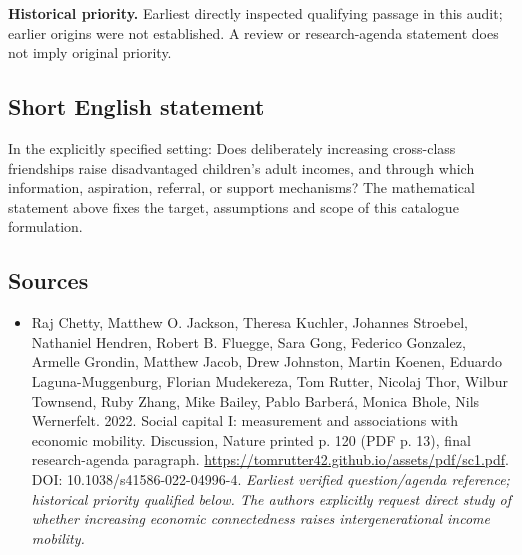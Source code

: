 \documentclass[11pt]{article}
\begin{document}
\par\textbf{Historical priority.} Earliest directly inspected qualifying passage in this audit; earlier origins were not established. A review or research-agenda statement does not imply original priority.

\subsection{Short English statement}
In the explicitly specified setting: Does deliberately increasing cross-class friendships raise disadvantaged children's adult incomes, and through which information, aspiration, referral, or support mechanisms? The mathematical statement above fixes the target, assumptions and scope of this catalogue formulation.

\subsection{Sources}
\begin{itemize}\raggedright
\item[\textnormal{[S1]}]\hypertarget{source:30007648:1}{} Raj Chetty, Matthew O. Jackson, Theresa Kuchler, Johannes Stroebel, Nathaniel Hendren, Robert B. Fluegge, Sara Gong, Federico Gonzalez, Armelle Grondin, Matthew Jacob, Drew Johnston, Martin Koenen, Eduardo Laguna-Muggenburg, Florian Mudekereza, Tom Rutter, Nicolaj Thor, Wilbur Townsend, Ruby Zhang, Mike Bailey, Pablo Barberá, Monica Bhole, Nils Wernerfelt. 2022. Social capital I: measurement and associations with economic mobility. Discussion, Nature printed p. 120 (PDF p. 13), final research-agenda paragraph.
\url{https://tomrutter42.github.io/assets/pdf/sc1.pdf}.
DOI: 10.1038/s41586-022-04996-4.
{\small\textit{Earliest verified question/agenda reference; historical priority qualified below. The authors explicitly request direct study of whether increasing economic connectedness raises intergenerational income mobility.}}
\end{itemize}
\end{document}

